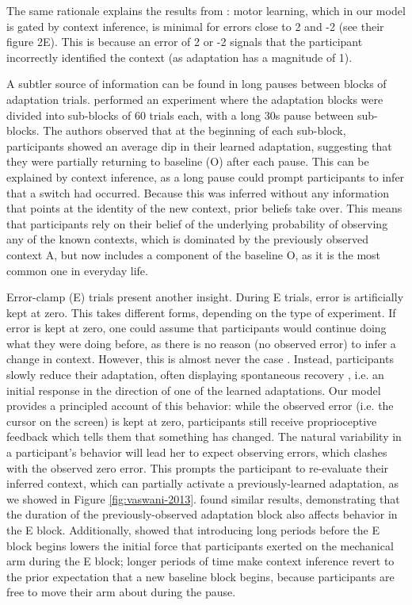 \documentclass[a4paper,doc,floatsintext,natbib]{apa6}
\def \fref #1{Figure \ref{#1}}     %
\begin{document}
The same rationale explains the results from \cite{Davidson_Scaling_2004}: motor learning, which in our model is gated by context inference, is minimal for errors close to 2 and -2 (see their figure 2E). This is because an error of 2 or -2 signals that the participant incorrectly identified the context (as adaptation has a magnitude of 1).

A subtler source of information can be found in long pauses between blocks of adaptation trials. \cite{Ethier_Spontaneous_2008} performed an experiment where the adaptation blocks were divided into sub-blocks of 60 trials each, with a long 30s pause between sub-blocks. The authors observed that at the beginning of each sub-block, participants showed an average dip in their learned adaptation, suggesting that they were partially returning to baseline (O) after each pause. This can be explained by context inference, as a long pause could prompt participants to infer that a switch had occurred. Because this was inferred without any information that points at the identity of the new context, prior beliefs take over. This means that participants rely on their belief of the underlying probability of observing any of the known contexts, which is dominated by the previously observed context A, but now includes a component of the baseline O, as it is the most common one in everyday life.

Error-clamp (E) trials present another insight. During E trials, error is artificially kept at zero. This takes different forms, depending on the type of experiment. If error is kept at zero, one could assume that participants would continue doing what they were doing before, as there is no reason (no observed error) to infer a change in context. However, this is almost never the case \cite[e.g.][]{Smith_Interacting_2006,Ethier_Spontaneous_2008,Forano_Timescales_2020,Vaswani_Decay_2013,Scheidt_Persistence_2000,Pekny_Protection_2011}. Instead, participants slowly reduce their adaptation, often displaying spontaneous recovery \cite[e.g.][]{Smith_Interacting_2006}, i.e. an initial response in the direction of one of the learned adaptations. Our model provides a principled account of this behavior: while the observed error (i.e. the cursor on the screen) is kept at zero, participants still receive proprioceptive feedback which tells them that something has changed. The natural variability in a participant's behavior will lead her to expect observing errors, which clashes with the observed zero error. This prompts the participant to re-evaluate their inferred context, which can partially activate a previously-learned adaptation, as we showed in \fref{fig:vaswani-2013}. \cite{Pekny_Protection_2011} found similar results, demonstrating that the duration of the previously-observed adaptation block also affects behavior in the E block. Additionally, \cite{Criscimagna-Hemminger_Consolidation_2008} showed that introducing long periods before the E block begins lowers the initial force that participants exerted on the mechanical arm during the E block; longer periods of time make context inference revert to the prior expectation that a new baseline block begins, because participants are free to move their arm about during the pause.
\end{document}
